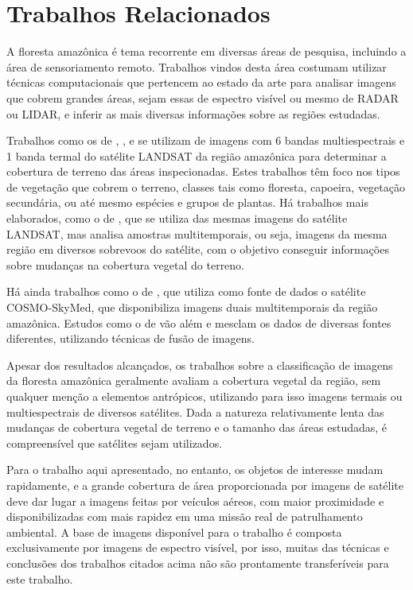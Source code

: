 \chapter{Trabalhos Relacionados}\label{cap:trabalhos}

A floresta amazônica é tema recorrente em diversas áreas de pesquisa, incluindo a área de sensoriamento remoto. Trabalhos vindos desta área costumam utilizar técnicas computacionais que pertencem ao estado da arte para analisar imagens que cobrem grandes áreas, sejam essas de espectro visível ou mesmo de RADAR ou LIDAR, e inferir as mais diversas informações sobre as regiões estudadas.

Trabalhos como os de , ,  e  se utilizam de imagens com 6 bandas multiespectrais e 1 banda termal do satélite LANDSAT da região amazônica para determinar a cobertura de terreno das áreas inspecionadas. Estes trabalhos têm foco nos tipos de vegetação que cobrem o terreno, classes tais como floresta, capoeira, vegetação secundária, ou até mesmo espécies e grupos de plantas. Há trabalhos mais elaborados, como o de , que se utiliza das mesmas imagens do satélite LANDSAT, mas analisa amostras multitemporais, ou seja, imagens da mesma região em diversos sobrevoos do satélite, com o objetivo conseguir informações sobre mudanças na cobertura vegetal do terreno.

Há ainda trabalhos como o de \cite{azevedo:2014}, que utiliza como fonte de dados o satélite COSMO-SkyMed,  que disponibiliza imagens duais multitemporais da região amazônica. Estudos como o de  vão além e mesclam os dados de diversas fontes diferentes, utilizando técnicas de fusão de imagens.

Apesar dos resultados alcançados, os trabalhos sobre a classificação de imagens da floresta amazônica geralmente avaliam a cobertura vegetal da região, sem qualquer menção a elementos antrópicos, utilizando para isso imagens termais ou multiespectrais de diversos satélites. Dada a natureza relativamente lenta das mudanças de cobertura vegetal de terreno e o tamanho das áreas estudadas, é compreensível que satélites sejam utilizados.

Para o trabalho aqui apresentado, no entanto, os objetos de interesse mudam rapidamente, e a grande cobertura de área proporcionada por imagens de satélite deve dar lugar a imagens feitas por veículos aéreos, com maior proximidade e disponibilizadas com mais rapidez em uma missão real de patrulhamento ambiental. A base de imagens disponível para o trabalho é composta exclusivamente por imagens de espectro visível, por isso, muitas das técnicas e conclusões dos trabalhos citados acima não são prontamente transferíveis para este trabalho.

